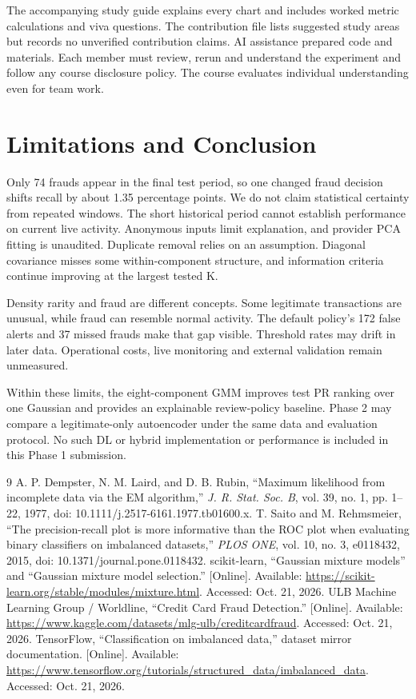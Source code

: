 \documentclass[conference]{IEEEtran}
\begin{document}
The accompanying study guide explains every chart and includes worked metric calculations and viva questions. The contribution file lists suggested study areas but records no unverified contribution claims. AI assistance prepared code and materials. Each member must review, rerun and understand the experiment and follow any course disclosure policy. The course evaluates individual understanding even for team work.

\section{Limitations and Conclusion}
Only 74 frauds appear in the final test period, so one changed fraud decision shifts recall by about 1.35 percentage points. We do not claim statistical certainty from repeated windows. The short historical period cannot establish performance on current live activity. Anonymous inputs limit explanation, and provider PCA fitting is unaudited. Duplicate removal relies on an assumption. Diagonal covariance misses some within-component structure, and information criteria continue improving at the largest tested K.

Density rarity and fraud are different concepts. Some legitimate transactions are unusual, while fraud can resemble normal activity. The default policy's 172 false alerts and 37 missed frauds make that gap visible. Threshold rates may drift in later data. Operational costs, live monitoring and external validation remain unmeasured.

Within these limits, the eight-component GMM improves test PR ranking over one Gaussian and provides an explainable review-policy baseline. Phase 2 may compare a legitimate-only autoencoder under the same data and evaluation protocol. No such DL or hybrid implementation or performance is included in this Phase 1 submission.

\begin{thebibliography}{9}
 A. P. Dempster, N. M. Laird, and D. B. Rubin, ``Maximum likelihood from incomplete data via the EM algorithm,'' \emph{J. R. Stat. Soc. B}, vol. 39, no. 1, pp. 1--22, 1977, doi: 10.1111/j.2517-6161.1977.tb01600.x.
 T. Saito and M. Rehmsmeier, ``The precision-recall plot is more informative than the ROC plot when evaluating binary classifiers on imbalanced datasets,'' \emph{PLOS ONE}, vol. 10, no. 3, e0118432, 2015, doi: 10.1371/journal.pone.0118432.
 scikit-learn, ``Gaussian mixture models'' and ``Gaussian mixture model selection.'' [Online]. Available: \url{https://scikit-learn.org/stable/modules/mixture.html}. Accessed: Oct. 21, 2026.
 ULB Machine Learning Group / Worldline, ``Credit Card Fraud Detection.'' [Online]. Available: \url{https://www.kaggle.com/datasets/mlg-ulb/creditcardfraud}. Accessed: Oct. 21, 2026.
 TensorFlow, ``Classification on imbalanced data,'' dataset mirror documentation. [Online]. Available: \url{https://www.tensorflow.org/tutorials/structured_data/imbalanced_data}. Accessed: Oct. 21, 2026.
\end{thebibliography}
\end{document}

